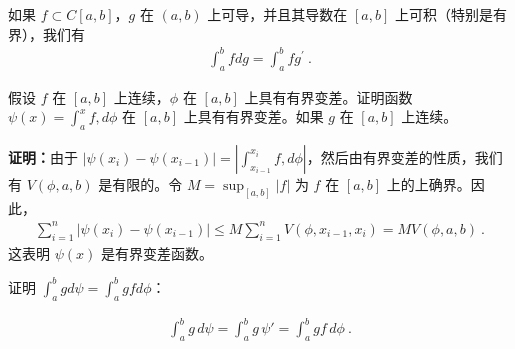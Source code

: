 \begin{theorem}{}
如果 $f\subset C[a,b]$，$g$ 在 $(a,b)$ 上可导，并且其导数在 $[a,b]$ 上可积（特别是有界），我们有
\begin{align}
\int_{a}^{b}fdg=\int_{a}^{b}fg^{\prime}~.
\end{align}
\end{theorem}

\begin{example}{假设 $f$ 在 $[a,b]$ 上连续，$\phi$ 在 $[a,b]$ 上具有有界变差。证明函数 $\psi(x)=\int_{a}^{x}f,d\phi$ 在 $[a,b]$ 上具有有界变差。如果 $g$ 在 $[a,b]$ 上连续。}

\textbf{证明：}由于 $ |\psi(x_i) - \psi(x_{i-1})| = \left|\int_{x_{i-1}}^{x_i}f , d\phi\right| $，然后由有界变差的性质，我们有 $ V(\phi, a, b) $ 是有限的。令 $ M = \sup_{[a,b]}|f| $ 为 $ f $ 在 $ [a, b] $ 上的上确界。因此， \begin{align} \sum_{i=1}^n |\psi(x_i) - \psi(x_{i-1})| \leq M \sum_{i=1}^n V(\phi,x_{i-1},x_i) = MV(\phi,a,b)~. \end{align} 这表明 $ \psi(x) $ 是有界变差函数。

证明 $\int_{a}^{b}gd\psi=\int_{a}^{b}gfd\phi$：

\begin{align}
\int_{a}^{b}g\,d\psi=\int_{a}^{b}g\,\psi'=\int_{a}^{b}gf\,d\phi~.
\end{align}
\end{example}

